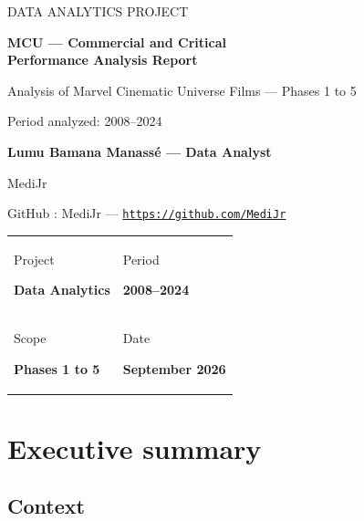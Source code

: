 \documentclass[a4paper,11pt]{article}
\newcommand{\reportmeta}[2]{\textcolor{reportgray}{\scriptsize #1}\par\textbf{#2}\par}
\begin{document}
\begin{titlepage}
  \vspace*{18mm}
  {\color{white}\sffamily\Large DATA ANALYTICS PROJECT}\par
  \vspace{25mm}
  {\color{reportblue}\sffamily\fontsize{27}{32}\selectfont\bfseries
    MCU --- Commercial and Critical\\
    Performance Analysis Report\par}
  \vspace{5mm}
  {\large Analysis of Marvel Cinematic Universe Films --- Phases 1 to 5\par}
  \vspace{8mm}
  {\large Period analyzed: 2008--2024\par}
  \vspace{12mm}
  {\sffamily\large\bfseries\color{reportblue} Lumu Bamana Manassé --- Data Analyst\par}
  \vspace{2mm}
  {\sffamily\large MediJr\par}
  \vspace{2mm}
  {\sffamily\small\color{reportgray}%
    GitHub : MediJr ---
    \href{https://github.com/MediJr}{\textcolor{reportblue}{\nolinkurl{https://github.com/MediJr}}}\par}
  \vfill
  \begin{tabular}{@{}ll@{}}
    \reportmeta{Project}{Data Analytics} &
    \reportmeta{Period}{2008--2024}\\[7mm]
    \reportmeta{Scope}{Phases 1 to 5} &
    \reportmeta{Date}{September 2026}
  \end{tabular}
  \vfill
\end{titlepage}

\tableofcontents
\newpage

\section{Executive summary}

\subsection{Context}
\end{document}
